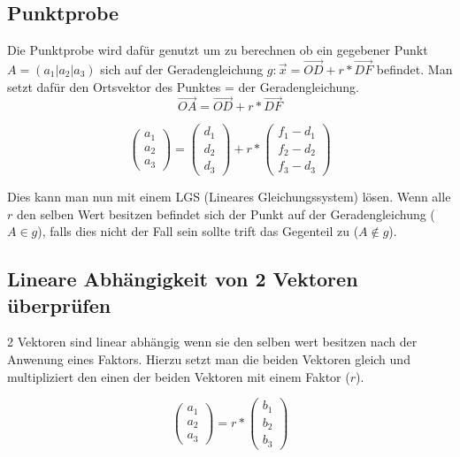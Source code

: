 \documentclass{article}
\begin{document}
\subsection{Punktprobe}
Die Punktprobe wird dafür genutzt um zu berechnen ob ein gegebener Punkt $A = (a_1 | a_2 | a_3)$ sich auf der Geradengleichung $g : \vec{x} = \vec{OD} + r * \vec{DF}$ befindet.
Man setzt dafür den Ortsvektor des Punktes = der Geradengleichung.
\begin{equation}
\vec{OA} = \vec{OD} + r * \vec{DF}
\end{equation}

\begin{equation}
\begin{pmatrix} a_1 \\ a_2 \\ a_3 \end{pmatrix} = \begin{pmatrix} d_1 \\ d_2 \\ d_3 \end{pmatrix} + r * \begin{pmatrix} f_1 - d_1 \\ f_2 - d_2 \\ f_3 - d_3 \end{pmatrix}
\end{equation}

Dies kann man nun mit einem LGS (Lineares Gleichungssystem) lösen. Wenn alle $r$ den selben Wert besitzen befindet sich der Punkt auf der Geradengleichung ($A \in g$), falls dies nicht der Fall sein sollte trift das Gegenteil zu ($A \notin g$).

\subsection{Lineare Abhängigkeit von 2 Vektoren überprüfen}
2 Vektoren sind linear abhängig wenn sie den selben wert besitzen nach der Anwenung eines Faktors. Hierzu setzt man die beiden Vektoren gleich und multipliziert den einen der beiden Vektoren mit einem Faktor ($r$).

\begin{equation}
\begin{pmatrix} a_1 \\ a_2 \\ a_3 \end{pmatrix} = r * \begin{pmatrix} b_1 \\ b_2 \\ b_3\end{pmatrix}
\end{equation}
\end{document}
